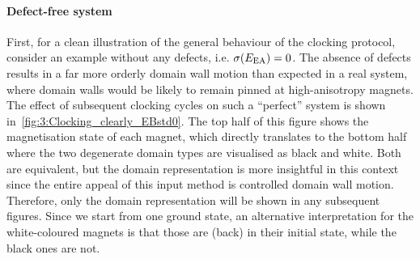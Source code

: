 \paragraph{Defect-free system}
First, for a clean illustration of the general behaviour of the clocking protocol, consider an example without any defects, i.e. $\sigma(E_\mathrm{EA}) = 0$.
The absence of defects results in a far more orderly domain wall motion than expected in a real system, where domain walls would be likely to remain pinned at high-anisotropy magnets.
The effect of subsequent clocking cycles on such a ``perfect'' system is shown in~\cref{fig:3:Clocking_clearly_EBstd0}.
The top half of this figure shows the magnetisation state of each magnet, which directly translates to the bottom half where the two degenerate domain types are visualised as black and white.
Both are equivalent, but the domain representation is more insightful in this context since the entire appeal of this input method is controlled domain wall motion.
Therefore, only the domain representation will be shown in any subsequent figures.
Since we start from one ground state, an alternative interpretation for the white-coloured magnets is that those are (back) in their initial state, while the black ones are not.


